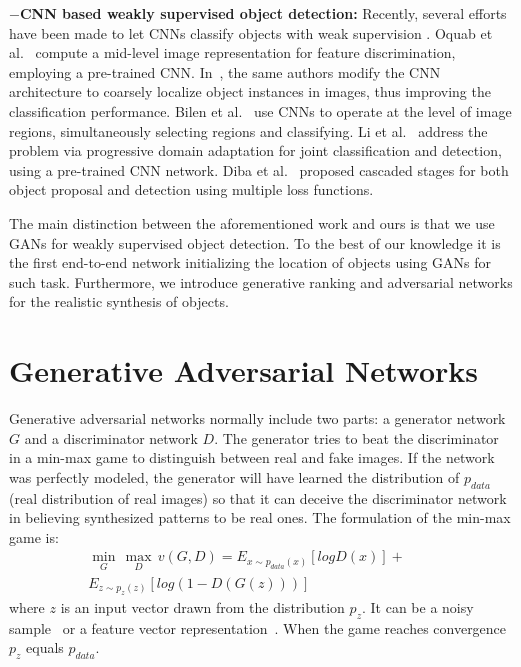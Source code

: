 \documentclass[runningheads]{llncs}
\begin{document}
$-$\textbf{CNN based weakly supervised object detection:} Recently, several efforts have been made to let CNNs classify objects with weak supervision \cite{Contextlocnet,bilen16,li16}. Oquab et al.~\cite{Oquab14} compute a mid-level image representation for feature discrimination, employing a pre-trained CNN. In~\cite{laptev15}, the same authors modify the CNN architecture to coarsely localize object instances in images, thus improving the classification performance.  Bilen et al.~\cite{bilen16} use CNNs to operate at the level of image regions, simultaneously selecting regions and classifying. Li et al.~\cite{li16} address the problem via progressive domain adaptation for joint  classification and detection, using a pre-trained CNN network.  Diba et al.~\cite{diba} proposed cascaded stages for both object proposal and detection using multiple loss functions.



The main distinction between the aforementioned work and ours is that we use GANs for weakly supervised object detection. To the best of our knowledge it is the first end-to-end network initializing the location of objects using GANs for such task. Furthermore, we introduce generative ranking and adversarial networks for the realistic synthesis of objects.





\section{Generative Adversarial Networks} \label{sec:gan}

Generative adversarial networks normally include two parts: a generator network $G$ and a discriminator network $D$. The generator tries to beat the discriminator in a min-max game to distinguish between real and fake images. If the network was perfectly modeled, the generator will have learned the distribution of $p_{data}$ (real distribution of real images) so that it can deceive the discriminator network in believing synthesized patterns to be real ones. The formulation of the min-max game is:
\begin{equation}
\begin{split}
\min_{G}\,\max_{D}\, v(G,D) = E_{x\sim p_{data}(x)}[log D(x)] + \qquad \\
E_{z\sim p_{z}(z)}[log(1-D(G(z)))]
\end{split}
\label{eq:1}
\end{equation}
where $z$ is an input vector drawn from the distribution $p_{z}$. It can be a noisy sample~\cite{dosovitskiy,goodfellow} or a feature vector representation~\cite{nguyen}. When the game reaches convergence $p_{z}$ equals $p_{data}$.  
\end{document}
